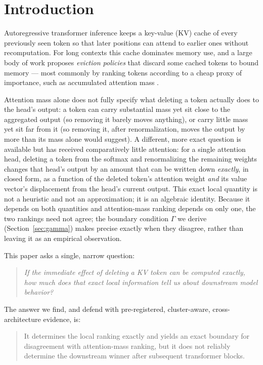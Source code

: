 \documentclass[11pt]{article}
\begin{document}
\section{Introduction}
\label{sec:intro}

Autoregressive transformer inference keeps a key-value (KV) cache of every
previously seen token so that later positions can attend to earlier ones
without recomputation. For long contexts this cache dominates memory use,
and a large body of work proposes \emph{eviction policies} that discard some
cached tokens to bound memory --- most commonly by ranking tokens according
to a cheap proxy of importance, such as accumulated attention mass
\cite{h2o2023,scissorhands2023,streamingllm2024}.

Attention mass alone does not fully specify what deleting a token actually
does to the head's output: a token can carry substantial mass yet sit close
to the aggregated output (so removing it barely moves anything), or carry
little mass yet sit far from it (so removing it, after renormalization,
moves the output by more than its mass alone would suggest). A different,
more exact question is available but has received comparatively little
attention: for a single attention head, deleting a token from the softmax
and renormalizing the remaining weights changes that head's output by an
amount that can be written down \emph{exactly}, in closed form, as a
function of the deleted token's attention weight \emph{and} its value
vector's displacement from the head's current output. This exact local
quantity is not a heuristic and not an approximation; it is an algebraic
identity. Because it depends on both quantities and attention-mass ranking
depends on only one, the two rankings need not agree; the boundary condition
$\Gamma$ we derive (Section~\ref{sec:gamma}) makes precise exactly when they
disagree, rather than leaving it as an empirical observation.

This paper asks a single, narrow question:

\begin{quote}
\emph{If the immediate effect of deleting a KV token can be computed
exactly, how much does that exact local information tell us about
downstream model behavior?}
\end{quote}

The answer we find, and defend with pre-registered, cluster-aware,
cross-architecture evidence, is:

\begin{quote}
It determines the local ranking exactly and yields an exact boundary for
disagreement with attention-mass ranking, but it does not reliably determine
the downstream winner after subsequent transformer blocks.
\end{quote}
\end{document}
